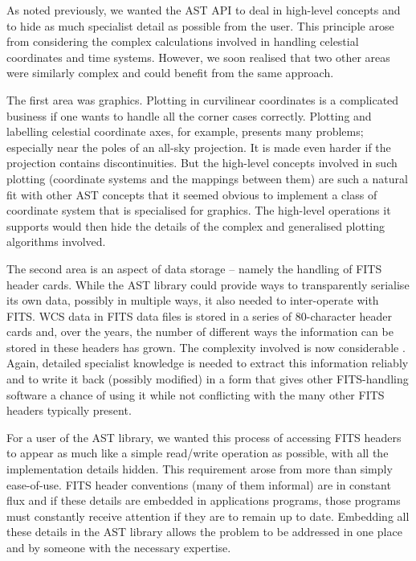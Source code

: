 \documentclass[final,authoryear,5p,times,twocolumn]{elsarticle}
\begin{document}
As noted previously, we wanted the AST API to deal in high-level
concepts and to hide as much specialist detail as possible from the
user. This principle arose from considering the complex calculations
involved in handling celestial coordinates and time systems. However,
we soon realised that two other areas were similarly complex and could
benefit from the same approach.

The first area was graphics. Plotting in curvilinear coordinates is a
complicated business if one wants to handle all the corner cases
correctly. Plotting and labelling celestial coordinate axes, for
example, presents many problems; especially near the poles of an all-sky
projection. It is made even harder if the projection contains
discontinuities. But the high-level concepts involved in such plotting
(coordinate systems and the mappings between them) are such a natural
fit with other AST concepts that it seemed obvious to implement a class
of coordinate system that is specialised for graphics. The high-level
operations it supports would then hide the details of the complex and
generalised plotting algorithms involved.

The second area is an aspect of data storage -- namely the handling of
FITS header cards. While the AST library could provide ways to
transparently serialise its own data, possibly in multiple ways, it
also needed to inter-operate with FITS. WCS data in FITS data files is
stored in a series of 80-character header cards and, over the years,
the number of different ways the information can be stored in these
headers has grown. The complexity involved is now considerable
\citep[see e.g.,][]{2015Thomas}. Again, detailed specialist knowledge
is needed to extract this information reliably and to write it back
(possibly modified) in a form that gives other FITS-handling software
a chance of using it while not conflicting with the many other FITS
headers typically present.

For a user of the AST library, we wanted this process of accessing FITS
headers to appear as much like a simple read/write operation as
possible, with all the implementation details hidden. This requirement
arose from more than simply ease-of-use. FITS header conventions (many
of them informal) are in constant flux and if these details are embedded
in applications programs, those programs must constantly receive
attention if they are to remain up to date. Embedding all these details
in the AST library allows the problem to be addressed in one place and
by someone with the necessary expertise.
\end{document}
